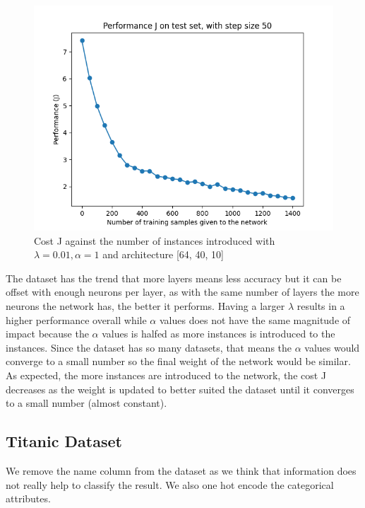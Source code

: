 \documentclass[letterpaper]{article}
\begin{document}
\begin{figure}[H]
	\includegraphics[width=\textwidth]{figures/nn_digits_cost.png}
	\caption{Cost J against the number of instances introduced with $\lambda=0.01, \alpha=1$ and architecture [64, 40, 10]}
	\label{fig:nn-digits}
\end{figure}

The dataset has the trend that more layers means less accuracy but it can be offset with enough neurons per layer, as with the same number of layers
the more neurons the network has, the better it performs. Having a larger $\lambda$ results in a higher performance overall while $\alpha$ values does
not have the same magnitude of impact because the $\alpha$ values is halfed as more instances is introduced to the instances. Since the dataset has
so many datasets, that means the $\alpha$ values would converge to a small number so the final weight of the network would be similar. As expected,
the more instances are introduced to the network, the cost J decreases as the weight is updated to better suited the dataset until it converges to a
small number (almost constant).

\subsection{Titanic Dataset}
We remove the name column from the dataset as we think that information does not really help to classify the result. We also one hot encode the categorical
attributes.
\end{document}
